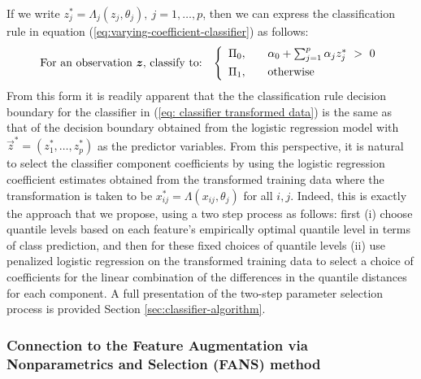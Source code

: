If we write $z_j^{*} = \Lambda_j (z_j, \theta_j),~ j = 1, \dots, p$, then we can
express the classification rule in equation
(\ref{eq:varying-coefficient-classifier}) as follows:
\begin{equation}
  \label{eq: classifier transformed data}
  \text{For an observation $\vec{z}$, classify to:} \hspace{3mm} \left\{ 
    \begin{array}{lcl}
      \Pi_0, & & \alpha_0 + \sum_{j = 1}^p \alpha_j z_j^{*} ~>~ 0 \\[1ex]
      \Pi_1, & & \text{otherwise} \\[0ex]
    \end{array}
  \right.
\end{equation}
From this form it is readily apparent that the the classification rule decision
boundary for the classifier in (\ref{eq: classifier transformed data}) is the
same as that of the decision boundary obtained from the logistic regression
model with $\vec{z}^{*} = (z_1^{*}, \dots, z_p^{*})$ as the predictor variables.
From this perspective, it is natural to select the classifier component
coefficients by using the logistic regression coefficient estimates obtained
from the transformed training data where the transformation is taken to be
$x_{ij}^{*} = \Lambda(x_{ij}, \theta_j)$ for all $i, j$.  Indeed, this is
exactly the approach that we propose, using a two step process as follows: first
(i) choose quantile levels based on each feature's empirically optimal quantile
level in terms of class prediction, and then for these fixed choices of quantile
levels (ii) use penalized logistic regression on the transformed training data
to select a choice of coefficients for the linear combination of the differences
in the quantile distances for each component.  A full presentation of the
two-step parameter selection process is provided Section
\ref{sec:classifier-algorithm}.




\subsubsection{Connection to the Feature Augmentation via Nonparametrics and
  Selection (FANS) method}
\label{sec:similarites-to-fans}


